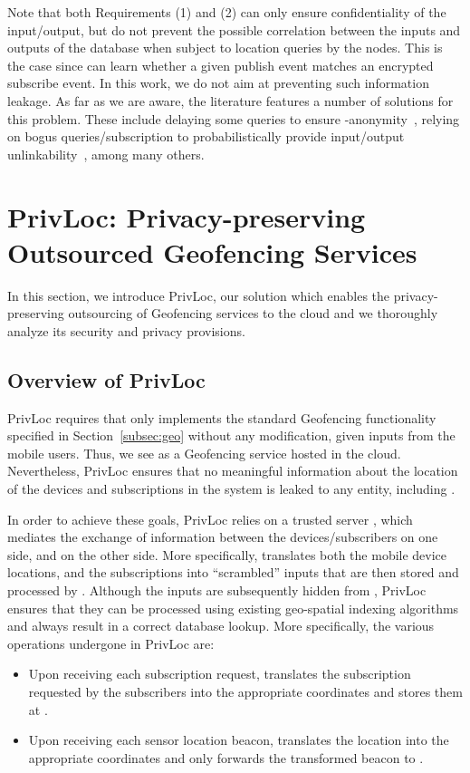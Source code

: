 \documentclass{llncs}
\newcommand\sol{{\sf PrivLoc}}
\begin{document}
\vspace{1 em}  Note that both Requirements (1) and (2) can only ensure confidentiality of the input/output, but do not prevent the possible correlation between
the inputs and outputs of the database when subject to location queries by the nodes. This is the case since  can learn whether a given publish event matches an encrypted subscribe event.
In this work, we do not aim at preventing such information leakage. As far as we are aware, the literature features a number of solutions for this problem. These include delaying some queries to ensure -anonymity~\cite{Guha:2012:KLP:2228298.2228317,Sweeney:2002:AKA:774544.774553,Sweeney:2002:KAM:774544.774552}, relying on
bogus queries/subscription to probabilistically provide input/output unlinkability~\cite{Kido05ananonymous}, among many others.


\section{PrivLoc: Privacy-preserving Outsourced Geofencing Services}\label{sec:solution}

In this section, we introduce \sol, our solution which enables the privacy-preserving outsourcing of Geofencing services to the cloud and we thoroughly analyze its security and privacy provisions.


\subsection{Overview of PrivLoc}\label{subsec:overview}

\sol{} requires that  only implements the standard Geofencing functionality specified in Section~\ref{subsec:geo} without any modification, given inputs from the mobile users. Thus, we see  as a Geofencing service hosted in the cloud. Nevertheless, \sol{} ensures that no meaningful information about the location of the devices and subscriptions in the system is leaked to any entity, including .

In order to achieve these goals, \sol{} relies on a trusted server , which mediates the exchange of information between the devices/subscribers on one side, and  on the other side. More specifically,
 translates both the mobile device locations, and the subscriptions into ``scrambled'' inputs that are then stored and processed by .
Although the inputs are subsequently hidden from , \sol{} ensures that they can be processed using existing geo-spatial indexing algorithms and always result in a correct database lookup. More specifically, the various operations undergone in \sol{} are:
\begin{itemize}
\item Upon receiving each subscription request,  translates the subscription requested by the subscribers into the appropriate coordinates and stores them at .
\item Upon receiving each sensor location beacon,  translates the location into the appropriate coordinates and only forwards the transformed beacon to .
\end{itemize}
\end{document}
